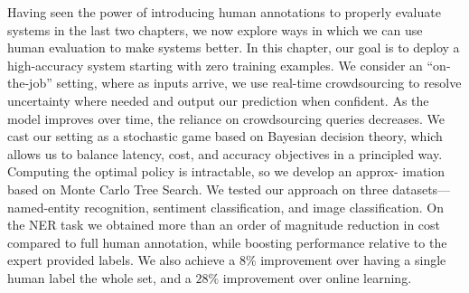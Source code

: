 Having seen the power of introducing human annotations to properly evaluate systems in the last two chapters, we now explore ways in which we can use human evaluation to make systems better.
In this chapter, our goal is to deploy a high-accuracy system starting with zero training examples.
We consider an ``on-the-job'' setting, where as inputs arrive, we use real-time crowdsourcing to resolve uncertainty where needed and output our prediction when confident. As the model improves over time, the reliance on crowdsourcing queries
decreases. We cast our setting as a stochastic game based on Bayesian decision
theory, which allows us to balance latency, cost, and accuracy objectives in a principled way. Computing the optimal policy is intractable, so we develop an approx-
imation based on Monte Carlo Tree Search. We tested our approach on three
datasets---named-entity recognition, sentiment classification, and image classification. On the NER task we obtained more than an order of magnitude reduction in cost compared to full
human annotation, while boosting performance relative to the expert provided labels. We also achieve a $8\%$ \fone{} improvement over having a single
human label the whole set, and a $28\%$ \fone{} improvement over online learning.

